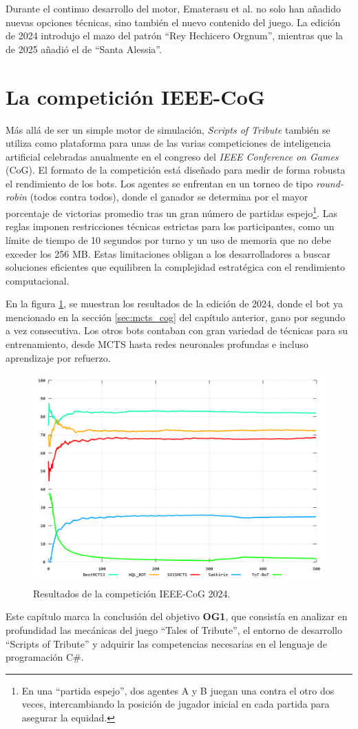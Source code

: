 Durante el continuo desarrollo del motor, Ematerasu et al. no solo han añadido nuevas opciones técnicas, sino también el nuevo contenido del juego. La edición de 2024 introdujo el mazo del patrón ``Rey Hechicero Orgnum'', mientras que la de 2025 añadió el de ``Santa Alessia''.

\section{La competición IEEE-CoG} \label{sec:competicion_ieee_cog}

Más allá de ser un simple motor de simulación, \textit{Scripts of Tribute} también se utiliza como plataforma para unas de las varias competiciones de inteligencia artificial celebradas anualmente en el congreso del \textit{IEEE Conference on Games} (CoG). El formato de la competición está diseñado para medir de forma robusta el rendimiento de los bots. Los agentes se enfrentan en un torneo de tipo \textit{round-robin} (todos contra todos), donde el ganador se determina por el mayor porcentaje de victorias promedio tras un gran número de partidas espejo\footnote{En una ``partida espejo'', dos agentes A y B juegan una contra el otro dos veces, intercambiando la posición de jugador inicial en cada partida para asegurar la equidad.}. Las reglas imponen restricciones técnicas estrictas para los participantes, como un límite de tiempo de 10 segundos por turno y un uso de memoria que no debe exceder los 256 MB. Estas limitaciones obligan a los desarrolladores a buscar soluciones eficientes que equilibren la complejidad estratégica con el rendimiento computacional.

En la figura \ref{fig:competicion_ieee_cog_2024}, se muestran los resultados de la edición de 2024, donde el bot ya mencionado en la sección \ref{sec:mcts_cog} del capítulo anterior, gano por segundo a vez consecutiva. Los otros bots contaban con gran variedad de técnicas para su entrenamiento, desde MCTS hasta redes neuronales profundas e incluso aprendizaje por refuerzo.

\begin{figure}[H]
	\centering
	\includegraphics[width=1.0\textwidth]{img/ieee-cog-2024.png}
	\caption{Resultados de la competición IEEE-CoG 2024. \cite{ematerasu_scriptsoftribute-competitionsarchive_2024}}
	\label{fig:competicion_ieee_cog_2024}
\end{figure}

Este capítulo marca la conclusión del objetivo \textbf{OG1}, que consistía en analizar en profundidad las mecánicas del juego ``Tales of Tribute'', el entorno de desarrollo ``Scripts of Tribute'' y adquirir las competencias necesarias en el lenguaje de programación C\#.